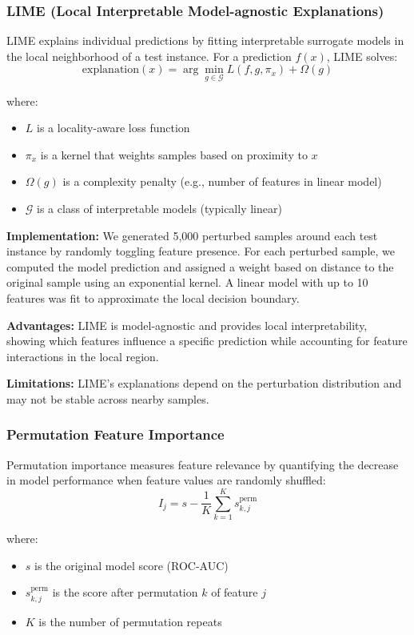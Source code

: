 \documentclass[journal]{IEEEtran}
\begin{document}
\subsubsection{LIME (Local Interpretable Model-agnostic Explanations)}

LIME explains individual predictions by fitting interpretable surrogate models in the local neighborhood of a test instance. For a prediction $f(x)$, LIME solves:
\[
\text{explanation}(x) = \arg\min_{g \in \mathcal{G}} L(f, g, \pi_x) + \Omega(g)
\]

where:
\begin{itemize}
    \item $L$ is a locality-aware loss function
    \item $\pi_x$ is a kernel that weights samples based on proximity to $x$
    \item $\Omega(g)$ is a complexity penalty (e.g., number of features in linear model)
    \item $\mathcal{G}$ is a class of interpretable models (typically linear)
\end{itemize}

\textbf{Implementation:} We generated 5,000 perturbed samples around each test instance by randomly toggling feature presence. For each perturbed sample, we computed the model prediction and assigned a weight based on distance to the original sample using an exponential kernel. A linear model with up to 10 features was fit to approximate the local decision boundary.

\textbf{Advantages:} LIME is model-agnostic and provides local interpretability, showing which features influence a specific prediction while accounting for feature interactions in the local region.

\textbf{Limitations:} LIME's explanations depend on the perturbation distribution and may not be stable across nearby samples.

\subsubsection{Permutation Feature Importance}

Permutation importance measures feature relevance by quantifying the decrease in model performance when feature values are randomly shuffled:
\[
I_j = s - \frac{1}{K}\sum_{k=1}^{K} s_{k,j}^{\text{perm}}
\]

where:
\begin{itemize}
    \item $s$ is the original model score (ROC-AUC)
    \item $s_{k,j}^{\text{perm}}$ is the score after permutation $k$ of feature $j$
    \item $K$ is the number of permutation repeats
\end{itemize}
\end{document}
